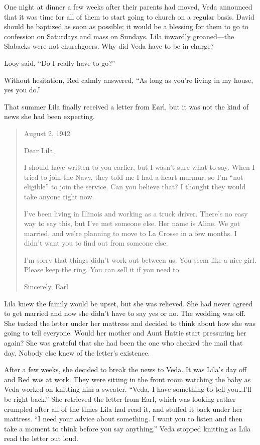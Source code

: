 \documentclass[
  american,
  letterpaper,
]{book}
\begin{document}
One night at dinner a few weeks after their parents had moved, Veda
announced that it was time for all of them to start going to church on a
regular basis. David should be baptized as soon as possible; it would be
a blessing for them to go to confession on Saturdays and mass on
Sundays. Lila inwardly groaned---the Slabacks were not churchgoers. Why
did Veda have to be in charge?

Looy said, ``Do I really have to go?''

Without hesitation, Red calmly answered, ``As long as you're living in
my house, yes you do.''

That summer Lila finally received a letter from Earl, but it was not the
kind of news she had been expecting.

\begin{quote}
August 2, 1942

Dear Lila,

I should have written to you earlier, but I wasn't sure what to say.
When I tried to join the Navy, they told me I had a heart murmur, so I'm
``not eligible'' to join the service. Can you believe that? I thought
they would take anyone right now.

I've been living in Illinois and working as a truck driver. There's no
easy way to say this, but I've met someone else. Her name is Aline. We
got married, and we're planning to move to La Crosse in a few months. I
didn't want you to find out from someone else.

I'm sorry that things didn't work out between us. You seem like a nice
girl. Please keep the ring. You can sell it if you need to.

Sincerely, Earl
\end{quote}

Lila knew the family would be upset, but she was relieved. She had never
agreed to get married and now she didn't have to say yes or no. The
wedding was off. She tucked the letter under her mattress and decided to
think about how she was going to tell everyone. Would her mother and
Aunt Hattie start pressuring her again? She was grateful that she had
been the one who checked the mail that day. Nobody else knew of the
letter's existence.

After a few weeks, she decided to break the news to Veda. It was Lila's
day off and Red was at work. They were sitting in the front room
watching the baby as Veda worked on knitting him a sweater. ``Veda, I
have something to tell you\ldots I'll be right back.'' She retrieved the
letter from Earl, which was looking rather crumpled after all of the
times Lila had read it, and stuffed it back under her mattress. ``I need
your advice about something. I want you to listen and then take a moment
to think before you say anything.'' Veda stopped knitting as Lila read
the letter out loud.
\end{document}

